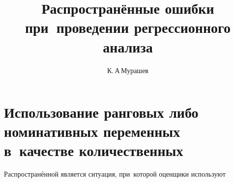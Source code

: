 \documentclass[]{scrartcl}
\title{Распространённые ошибки при~проведении регрессионного анализа}
\author{К.\,А\,Мурашев}
\begin{document}
\maketitle

\begin{abstract}

\end{abstract}

\section{Использование ранговых либо номинативных переменных в~качестве количественных}\label{nominative.as.quantitive}
Распространённой является ситуация, при~которой оценщики используют 
\end{document}
